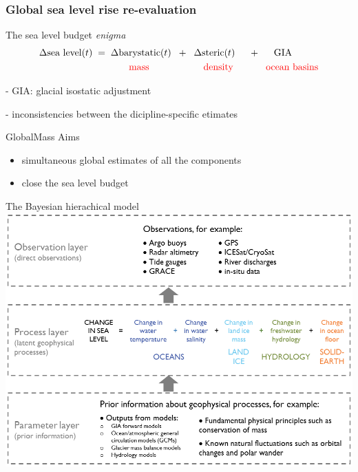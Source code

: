 \documentclass{beamer}
\begin{document}
\begin{frame}
\frametitle{Global sea level rise re-evaluation}
\begin{block}{The sea level budget \emph{enigma}}
\begin{align*}
&\Delta \mbox{sea level} (t) \hspace{0.1cm}= \hspace{0.1cm} \Delta\mbox{barystatic}(t) \hspace{0.2cm} + \hspace{0.2cm} \Delta\mbox{steric}(t) \hspace{0.5cm}+ \hspace{0.5cm} \mbox{GIA}\\
&\color{red}\hspace{3.3cm} \mbox{mass} \hspace{2cm}\mbox{density} \hspace{1.2cm} \mbox{ocean basins}
\end{align*}

- GIA: glacial isostatic adjustment

- inconsistencies between the dicipline-specific etimates
\end{block}
\begin{block}{GlobalMass Aims}
\begin{itemize}
\item simultaneous global estimates of all the components
\item close the sea level budget
\end{itemize}
\end{block}

\end{frame}

\begin{frame}{The Bayesian hierachical model}
\vspace{0.5cm}
\centering
\includegraphics[height = 0.7\textheight]{images/GMconcept-simplified}

\end{frame}
\end{document}
